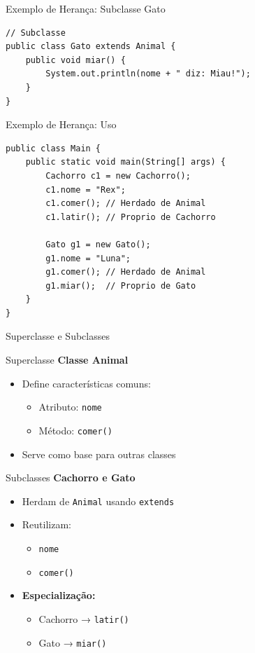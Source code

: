 \documentclass[9pt]{beamer}
\begin{document}
\begin{frame}[fragile]{Exemplo de Herança: Subclasse Gato}
\begin{lstlisting}
// Subclasse
public class Gato extends Animal {
    public void miar() {
        System.out.println(nome + " diz: Miau!");
    }
}
\end{lstlisting}
\end{frame}

\begin{frame}[fragile]{Exemplo de Herança: Uso}
\begin{lstlisting}
public class Main {
    public static void main(String[] args) {
        Cachorro c1 = new Cachorro();
        c1.nome = "Rex";
        c1.comer(); // Herdado de Animal
        c1.latir(); // Proprio de Cachorro

        Gato g1 = new Gato();
        g1.nome = "Luna";
        g1.comer(); // Herdado de Animal
        g1.miar();  // Proprio de Gato
    }
}
\end{lstlisting}
\end{frame}
\begin{frame}{Superclasse e Subclasses}

\begin{block}{Superclasse}
\textbf{Classe Animal}
\begin{itemize}
    \item Define características comuns:
    \begin{itemize}
        \item Atributo: \texttt{nome}
        \item Método: \texttt{comer()}
    \end{itemize}
    \item Serve como base para outras classes
\end{itemize}
\end{block}

\begin{exampleblock}{Subclasses}
\textbf{Cachorro e Gato}
\begin{itemize}
    \item Herdam de \texttt{Animal} usando \texttt{extends}
    \item Reutilizam:
    \begin{itemize}
        \item \texttt{nome}
        \item \texttt{comer()}
    \end{itemize}
    \item \textbf{Especialização:}
    \begin{itemize}
        \item Cachorro → \texttt{latir()}
        \item Gato → \texttt{miar()}
    \end{itemize}
\end{itemize}
\end{exampleblock}

\end{frame}
\end{document}
